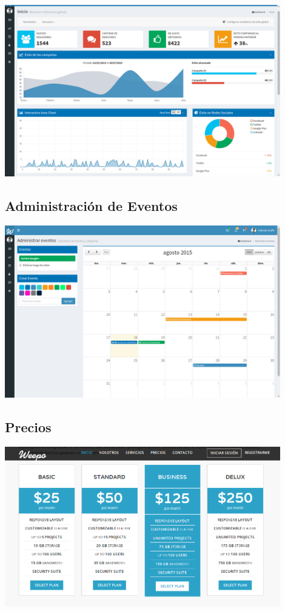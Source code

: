 \documentclass[oneside]{book}
\begin{document}
\includegraphics[width=0.9\textwidth]{images/InfoGral.png}

\medskip
\subsection{Administraci\'{o}n de Eventos}

\includegraphics[width=0.9\textwidth]{images/adminEventos.png}

\medskip
\subsection{Precios}

\includegraphics[width=0.9\textwidth]{images/business.png}
\end{document}
